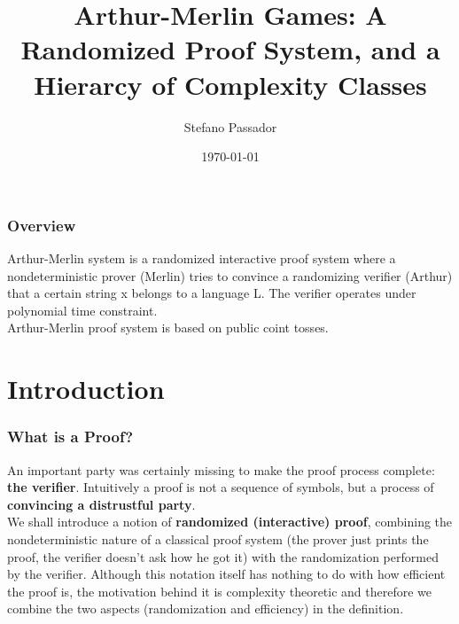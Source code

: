 \documentclass{beamer}
\title[Arthur-Merlin Games]{Arthur-Merlin Games: A Randomized Proof System, and a Hierarcy of Complexity Classes} %
\author{Stefano Passador} %
\institute[UNIUD] %
{
University of Udine \\ %
\medskip
\textit{passador.stefano@spes.uniud.it} %
}
\date{\today} %
\begin{document}
\begin{frame}
\titlepage %
\end{frame}

\begin{frame}
\frametitle{Overview} %
\tableofcontents %
\end{frame}


\begin{frame}
Arthur-Merlin system is a randomized interactive proof system where a nondeterministic prover (Merlin) tries to convince a randomizing verifier (Arthur) that a certain string x belongs to a language L. The verifier operates under polynomial time constraint. \\
Arthur-Merlin proof system is based on public coint tosses.
\end{frame}



\section{Introduction}

\begin{frame}
\frametitle{What is a Proof?}
An important party was certainly missing to make the proof process complete: \textbf{the verifier}. Intuitively a proof is not a sequence of symbols, but a process of \textbf{convincing a distrustful party}.\\
We shall introduce a notion of \textbf{randomized (interactive) proof}, combining the nondeterministic nature of a classical proof system (the prover just prints the proof, the verifier doesn't ask how he got it) with the randomization performed by the verifier. Although this notation itself has nothing to do with how efficient the proof is, the motivation behind it is complexity theoretic and therefore we combine the two aspects (randomization and efficiency) in the definition.
\end{frame}
\end{document}
